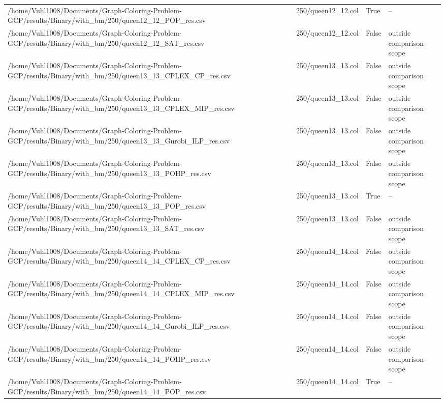 \begin{table}[htbp]
\begin{tabular}{llll}
/home/Vuhl1008/Documents/Graph-Coloring-Problem-GCP/results/Binary/with\_bm/250/queen12\_12\_POP\_res.csv & 250/queen12\_12.col & True & -- \\
/home/Vuhl1008/Documents/Graph-Coloring-Problem-GCP/results/Binary/with\_bm/250/queen12\_12\_SAT\_res.csv & 250/queen12\_12.col & False & outside comparison scope \\
/home/Vuhl1008/Documents/Graph-Coloring-Problem-GCP/results/Binary/with\_bm/250/queen13\_13\_CPLEX\_CP\_res.csv & 250/queen13\_13.col & False & outside comparison scope \\
/home/Vuhl1008/Documents/Graph-Coloring-Problem-GCP/results/Binary/with\_bm/250/queen13\_13\_CPLEX\_MIP\_res.csv & 250/queen13\_13.col & False & outside comparison scope \\
/home/Vuhl1008/Documents/Graph-Coloring-Problem-GCP/results/Binary/with\_bm/250/queen13\_13\_Gurobi\_ILP\_res.csv & 250/queen13\_13.col & False & outside comparison scope \\
/home/Vuhl1008/Documents/Graph-Coloring-Problem-GCP/results/Binary/with\_bm/250/queen13\_13\_POHP\_res.csv & 250/queen13\_13.col & False & outside comparison scope \\
/home/Vuhl1008/Documents/Graph-Coloring-Problem-GCP/results/Binary/with\_bm/250/queen13\_13\_POP\_res.csv & 250/queen13\_13.col & True & -- \\
/home/Vuhl1008/Documents/Graph-Coloring-Problem-GCP/results/Binary/with\_bm/250/queen13\_13\_SAT\_res.csv & 250/queen13\_13.col & False & outside comparison scope \\
/home/Vuhl1008/Documents/Graph-Coloring-Problem-GCP/results/Binary/with\_bm/250/queen14\_14\_CPLEX\_CP\_res.csv & 250/queen14\_14.col & False & outside comparison scope \\
/home/Vuhl1008/Documents/Graph-Coloring-Problem-GCP/results/Binary/with\_bm/250/queen14\_14\_CPLEX\_MIP\_res.csv & 250/queen14\_14.col & False & outside comparison scope \\
/home/Vuhl1008/Documents/Graph-Coloring-Problem-GCP/results/Binary/with\_bm/250/queen14\_14\_Gurobi\_ILP\_res.csv & 250/queen14\_14.col & False & outside comparison scope \\
/home/Vuhl1008/Documents/Graph-Coloring-Problem-GCP/results/Binary/with\_bm/250/queen14\_14\_POHP\_res.csv & 250/queen14\_14.col & False & outside comparison scope \\
/home/Vuhl1008/Documents/Graph-Coloring-Problem-GCP/results/Binary/with\_bm/250/queen14\_14\_POP\_res.csv & 250/queen14\_14.col & True & -- \\

\end{tabular}
\end{table}
